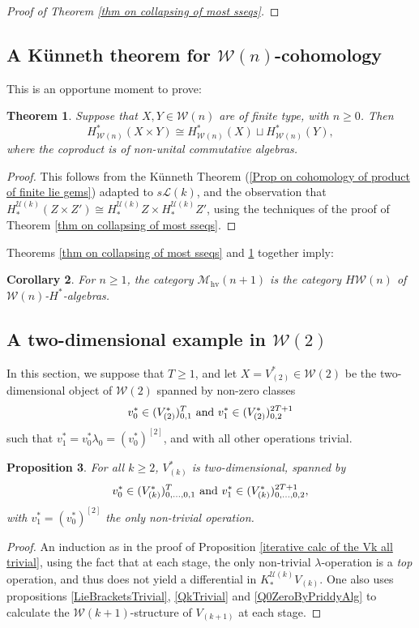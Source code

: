 \documentclass[11pt]{amsart} \renewcommand{\baselinestretch}{1.2}
\theoremstyle{plain}
\newtheorem{thm}{Theorem}[section] %
\newtheorem{prop}[thm]{Proposition}
\newtheorem{cor}[thm]{Corollary}
\numberwithin{equation}{section} %
\theoremstyle{plain}
\newtheorem{thm}{Theorem}[chapter] %
\newtheorem{prop}[thm]{Proposition}
\newtheorem{cor}[thm]{Corollary}
\numberwithin{equation}{chapter} %
\newcommand{\calU}{\mathcal{U}}
\newcommand{\calL}{\mathcal{L}}
\newcommand{\calw}{\mathcal{W}}
\newcommand{\calu}{\mathcal{U}}
\newcommand{\call}{\mathcal{L}}
\newcommand{\calMhv}{\mathcal{M}_\mathrm{hv}}
\newcommand{\restn}[1]{#1^{[2]}}
\newcommand{\HA}[1]{H#1}
\newcommand{\SubsectionOrSection}[1]{\subsection{#1}}
\begin{document}
\begin{Calculations of HWn}
\begin{proof}[Proof of Theorem \ref{thm on collapsing of most sseqs}]
\end{proof}
\SubsectionOrSection{A K\"unneth theorem for $\calw(n)$-cohomology}
This is an opportune moment to prove:
\begin{thm}
\label{Koszul-dual Hilton-Milnor theorem}
Suppose that $X,Y\in\calw(n)$ are  of finite type, with $n\geq0$. Then 
\[H^*_{\calw(n)}(X\times Y)\cong H^*_{\calw(n)}(X)\sqcup H^*_{\calw(n)}(Y),\]
where the coproduct is of non-unital commutative algebras.
\end{thm}
\begin{proof}
This follows from the K\"unneth Theorem (\ref{Prop on cohomology of product of finite lie gems}) adapted to $s\call(k)$, and the observation that $H_*^{\calu(k)}(Z\times Z')\cong H_*^{\calu(k)}Z\times H_*^{\calu(k)}Z'$,
using the techniques of the proof of Theorem \ref{thm on collapsing of most sseqs}.
\end{proof}
Theorems \ref{thm on collapsing of most sseqs} and \ref{Koszul-dual Hilton-Milnor theorem} together imply:
\begin{cor}
\label{yeah it's Wn-coh-algs}
For $n\geq1$, the category $\calMhv(n+1)$ is the category $\HA{\calw(n)}$ of $\calw(n)$-$H^*$-algebras.
\end{cor}
\SubsectionOrSection{A two-dimensional example in $\calw(2)$}
In this section, we suppose that $T\geq1$, and let $X=V^*_{(2)}\in\calw(2)$ be the two-dimensional object of $\calw(2)$ spanned by non-zero classes 
\[v_{0}^{*}\in (V^*_{(2)})^{T}_{0,1}\textup{ and }v_{1}^{*}\in (V^*_{(2)})^{2T+1}_{0,2}\]
such that $v^*_{1}=v^*_0\lambda_{0}=\restn{(v^*_0)}$, and with all other operations trivial. 
\begin{prop}
\label{2d example in w2}
For all $k\geq2$, $V^*_{(k)}$ is two-dimensional, spanned by
\[v_{0}^{*}\in (V^*_{(k)})^{T}_{0,\ldots,0,1}\textup{ and }v_{1}^{*}\in (V^*_{(k)})^{2T+1}_{0,\ldots,0,2},\]
with  $v^*_{1}=\restn{(v^*_0)}$ the only non-trivial operation.
\end{prop}
\begin{proof}
An induction as in the proof of Proposition \ref{iterative calc of the Vk all trivial}, using the fact that at each stage, the only non-trivial $\lambda$-operation is a \emph{top} operation, and thus does not yield a differential in $K_*^{\calU(k)}V_{(k)}$. One also uses propositions \ref{LieBracketsTrivial}, \ref{QkTrivial} and \ref{Q0ZeroByPriddyAlg} to calculate the $\calw(k+1)$-structure of $V_{(k+1)}$ at each stage.

\end{proof}
\end{Calculations of HWn}
\end{document}
